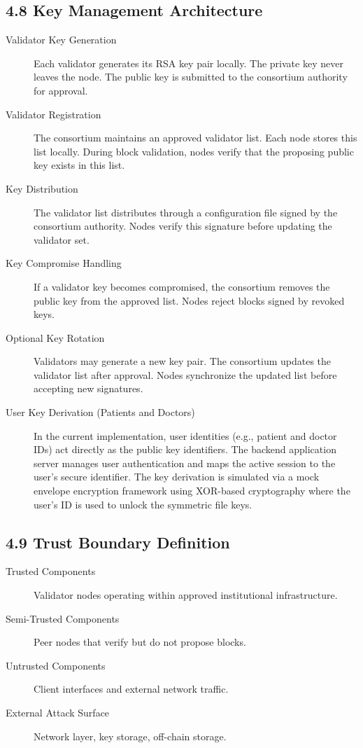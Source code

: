 \subsection*{4.8 Key Management Architecture}
\begin{description}
\item[Validator Key Generation]
Each validator generates its RSA key pair locally. The private key never leaves the node. The public key is submitted to the consortium authority for approval.

\item[Validator Registration]
The consortium maintains an approved validator list. Each node stores this list locally. During block validation, nodes verify that the proposing public key exists in this list.

\item[Key Distribution]
The validator list distributes through a configuration file signed by the consortium authority. Nodes verify this signature before updating the validator set.

\item[Key Compromise Handling]
If a validator key becomes compromised, the consortium removes the public key from the approved list. Nodes reject blocks signed by revoked keys.

\item[Optional Key Rotation]
Validators may generate a new key pair. The consortium updates the validator list after approval. Nodes synchronize the updated list before accepting new signatures.

\item[User Key Derivation (Patients and Doctors)]
In the current implementation, user identities (e.g., patient and doctor IDs) act directly as the public key identifiers. The backend application server manages user authentication and maps the active session to the user's secure identifier. The key derivation is simulated via a mock envelope encryption framework using XOR-based cryptography where the user's ID is used to unlock the symmetric file keys.
\end{description}
\subsection*{4.9 Trust Boundary Definition}
\begin{description}
\item[Trusted Components]
Validator nodes operating within approved institutional infrastructure.
\item[Semi-Trusted Components]
Peer nodes that verify but do not propose blocks.
\item[Untrusted Components]
Client interfaces and external network traffic.
\item[External Attack Surface]
Network layer, key storage, off-chain storage.
\end{description}

